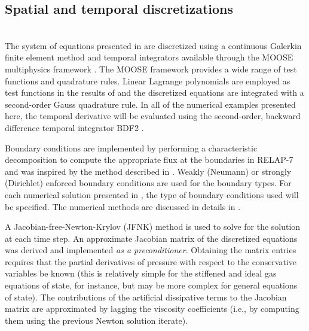 \documentclass{inputs/mc2015}
\begin{document}
%
\subsection{Spatial and temporal discretizations} \label{sec:spatial-disc}
%
 \\ 
The system of equations presented in  are discretized using a continuous Galerkin finite element 
method and temporal integrators available through the MOOSE multiphysics framework \cite{MOOSE}.
The MOOSE framework 
provides a wide range of test functions and quadrature rules. Linear Lagrange polynomials are employed 
as test functions in the results of  and the discretized equations are integrated with a second-order Gauss quadrature rule.
In all of the numerical examples presented here, the temporal derivative  will be 
evaluated using the second-order, backward difference temporal integrator BDF2 \cite{bdf2}.

Boundary conditions are implemented by performing a characteristic decomposition to compute the 
appropriate flux at the boundaries in RELAP-7 and was inspired by the method described in \cite{SEM}. 
Weakly (Neumann) or strongly (Dirichlet) enforced boundary conditions are used for the boundary types.
For each numerical solution presented in , the type of boundary conditions used 
will be specified. 
The numerical methods are discussed in details in \cite{Berry_Peterson_2014}.

A Jacobian-free-Newton-Krylov (JFNK) method is used to solve for the solution at each time step. 
An approximate Jacobian matrix of the discretized equations was derived and implemented \emph{as a preconditioner}. Obtaining the 
matrix entries requires that the partial derivatives of pressure with respect to the conservative variables 
be known (this is relatively simple for the stiffened and ideal gas equations of state, for instance, but may be more 
complex for general equations of state). The contributions of the artificial dissipative terms to the 
Jacobian matrix are approximated by lagging the viscosity coefficients (i.e., by computing them using the previous Newton solution iterate). 
%
\end{document}

